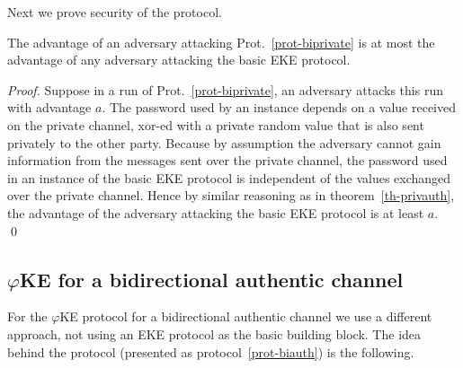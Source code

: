 \documentclass[runningheads,envcountsame,envcountsect,oribibl]{llncs}
\newcommand{\eke}{$\varphi$KE}
\begin{document}
Next we prove security of the protocol.
\begin{theorem}
The advantage of an adversary attacking Prot.~\ref{prot-biprivate} is at most
the advantage of any adversary attacking the basic EKE protocol.
\end{theorem}
\begin{proof}
Suppose in a run of Prot.~\ref{prot-biprivate}, an adversary attacks this run
with advantage $a$. The password used by an instance depends on a value
received on the private channel, xor-ed with a private random value that is
also sent privately to the other party. Because by assumption the adversary
cannot gain information from the messages sent over the private channel,
the password used in an instance of the basic EKE protocol is independent of
the values exchanged over the private channel. Hence by similar reasoning as in
theorem~\ref{th-privauth}, the advantage of the adversary attacking the basic
EKE protocol is at least $a$.
\qed
\end{proof}

\subsection{\eke{} for a bidirectional authentic channel}

For the \eke{} protocol for a bidirectional authentic channel we use a
different approach, not using an EKE protocol as the basic building block.
The idea behind the protocol (presented as protocol~\ref{prot-biauth})
is the following. 
\end{document}
